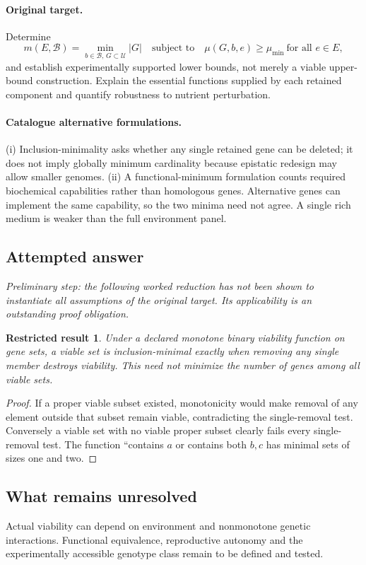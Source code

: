 \documentclass[11pt]{article}
\newtheorem{attemptresult}{Restricted result}[section]
\begin{document}
\paragraph{Original target.}
Determine
\[
 m(E,\mathcal B)=\min_{b\in\mathcal B,\,G\subset\mathcal U}
 |G|\quad\text{subject to}\quad
 \mu(G,b,e)\geq\mu_{\min}\ \text{for all }e\in E,
\]
and establish experimentally supported lower bounds, not merely a viable upper-bound construction. Explain the essential functions supplied by each retained component and quantify robustness to nutrient perturbation.
\paragraph{Catalogue alternative formulations.}
(i) Inclusion-minimality asks whether any single retained gene can be deleted; it does not imply globally minimum cardinality because epistatic redesign may allow smaller genomes. (ii) A functional-minimum formulation counts required biochemical capabilities rather than homologous genes. Alternative genes can implement the same capability, so the two minima need not agree. A single rich medium is weaker than the full environment panel.
\subsection{Attempted answer}
\noindent\emph{Preliminary step: the following worked reduction has not been shown to instantiate all assumptions of the original target. Its applicability is an outstanding proof obligation.}

\begin{attemptresult}
Under a declared monotone binary viability function on gene sets, a viable set is inclusion-minimal exactly when removing any single member destroys viability. This need not minimize the number of genes among all viable sets.
\end{attemptresult}
\begin{proof}
If a proper viable subset existed, monotonicity would make removal of any element outside that subset remain viable, contradicting the single-removal test. Conversely a viable set with no viable proper subset clearly fails every single-removal test. The function ``contains $a$ or contains both $b,c$ has minimal sets of sizes one and two.
\end{proof}
\subsection{What remains unresolved}
Actual viability can depend on environment and nonmonotone genetic interactions. Functional equivalence, reproductive autonomy and the experimentally accessible genotype class remain to be defined and tested.
\end{document}
